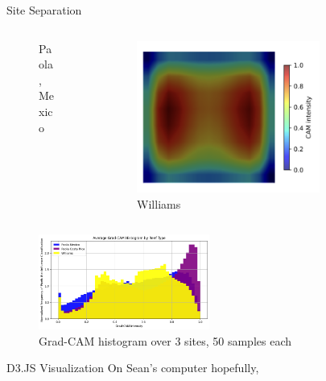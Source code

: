 \begin{frame}{Site Separation}
\begin{columns}
\begin{column}{0.25\textwidth}
\begin{figure}
                \caption{Paola, Mexico}
            \end{figure}
        \end{column}
        \begin{column}{0.25\textwidth}
            \begin{figure}
                \centering
                \includegraphics[height=0.2\textheight,width=0.75\textwidth,keepaspectratio]{images/WilliamsNonDegraded.png}
                \caption{Williams}
            \end{figure}
        \end{column}
    \end{columns}
    \begin{figure}
        \centering
        \includegraphics[height=0.25\textheight,width=0.5\textwidth,keepaspectratio]{images/gradcamsitesep.jpg}
        \caption{Grad-CAM histogram over 3 sites, 50 samples each}
    \end{figure}
\end{frame}

\begin{frame}{D3.JS Visualization}
    On Sean's computer hopefully, \href{graph}{} \href{spectrogram}{}
\end{frame}